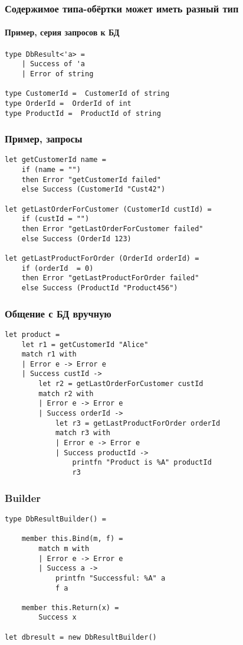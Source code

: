 \documentclass{../../slides-style}
\begin{document}
    \begin{frame}[fragile]
        \frametitle{Содержимое типа-обёртки может иметь разный тип}
        \framesubtitle{Пример, серия запросов к БД}
        \begin{verbatim}
type DbResult<'a> = 
    | Success of 'a
    | Error of string

type CustomerId =  CustomerId of string
type OrderId =  OrderId of int
type ProductId =  ProductId of string
        \end{verbatim}
    \end{frame}

    \begin{frame}[fragile]
        \frametitle{Пример, запросы}
        \begin{verbatim}
let getCustomerId name =
    if (name = "") 
    then Error "getCustomerId failed"
    else Success (CustomerId "Cust42")

let getLastOrderForCustomer (CustomerId custId) =
    if (custId = "") 
    then Error "getLastOrderForCustomer failed"
    else Success (OrderId 123)

let getLastProductForOrder (OrderId orderId) =
    if (orderId  = 0) 
    then Error "getLastProductForOrder failed"
    else Success (ProductId "Product456")
        \end{verbatim}
    \end{frame}

    \begin{frame}[fragile]
        \frametitle{Общение с БД вручную}
        \begin{verbatim}
let product = 
    let r1 = getCustomerId "Alice"
    match r1 with 
    | Error e -> Error e
    | Success custId ->
        let r2 = getLastOrderForCustomer custId 
        match r2 with 
        | Error e -> Error e
        | Success orderId ->
            let r3 = getLastProductForOrder orderId 
            match r3 with 
            | Error e -> Error e
            | Success productId ->
                printfn "Product is %A" productId
                r3
        \end{verbatim}
    \end{frame}

    \begin{frame}[fragile]
        \frametitle{Builder}
        \begin{verbatim}
type DbResultBuilder() =

    member this.Bind(m, f) = 
        match m with
        | Error e -> Error e
        | Success a -> 
            printfn "Successful: %A" a
            f a

    member this.Return(x) = 
        Success x

let dbresult = new DbResultBuilder()
        \end{verbatim}
    \end{frame}
\end{document}
